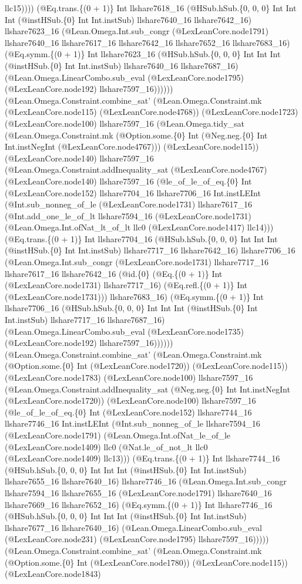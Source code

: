 \documentclass[11pt]{article}
\begin{document}
llc15)))) (@Eq.trans.\{(0 + 1)\} Int llshare7618\_16 (@HSub.hSub.\{0, 0, 0\} Int Int Int (@instHSub.\{0\} Int Int.instSub) llshare7640\_16 llshare7642\_16) llshare7623\_16 (@Lean.Omega.Int.sub\_congr (@LexLeanCore.node1791) llshare7640\_16 llshare7617\_16 llshare7642\_16 llshare7652\_16 llshare7683\_16) (@Eq.symm.\{(0 + 1)\} Int llshare7623\_16 (@HSub.hSub.\{0, 0, 0\} Int Int Int (@instHSub.\{0\} Int Int.instSub) llshare7640\_16 llshare7687\_16) (@Lean.Omega.LinearCombo.sub\_eval (@LexLeanCore.node1795) (@LexLeanCore.node192) llshare7597\_16)))))) (@Lean.Omega.Constraint.combine\_sat' (@Lean.Omega.Constraint.mk (@LexLeanCore.node115) (@LexLeanCore.node4768)) (@LexLeanCore.node1723) (@LexLeanCore.node100) llshare7597\_16 (@Lean.Omega.tidy\_sat (@Lean.Omega.Constraint.mk (@Option.some.\{0\} Int (@Neg.neg.\{0\} Int Int.instNegInt (@LexLeanCore.node4767))) (@LexLeanCore.node115)) (@LexLeanCore.node140) llshare7597\_16 (@Lean.Omega.Constraint.addInequality\_sat (@LexLeanCore.node4767) (@LexLeanCore.node140) llshare7597\_16 (@le\_of\_le\_of\_eq.\{0\} Int (@LexLeanCore.node152) llshare7704\_16 llshare7706\_16 Int.instLEInt (@Int.sub\_nonneg\_of\_le (@LexLeanCore.node1731) llshare7617\_16 (@Int.add\_one\_le\_of\_lt llshare7594\_16 (@LexLeanCore.node1731) (@Lean.Omega.Int.ofNat\_lt\_of\_lt llc0 (@LexLeanCore.node1417) llc14))) (@Eq.trans.\{(0 + 1)\} Int llshare7704\_16 (@HSub.hSub.\{0, 0, 0\} Int Int Int (@instHSub.\{0\} Int Int.instSub) llshare7717\_16 llshare7642\_16) llshare7706\_16 (@Lean.Omega.Int.sub\_congr (@LexLeanCore.node1731) llshare7717\_16 llshare7617\_16 llshare7642\_16 (@id.\{0\} (@Eq.\{(0 + 1)\} Int (@LexLeanCore.node1731) llshare7717\_16) (@Eq.refl.\{(0 + 1)\} Int (@LexLeanCore.node1731))) llshare7683\_16) (@Eq.symm.\{(0 + 1)\} Int llshare7706\_16 (@HSub.hSub.\{0, 0, 0\} Int Int Int (@instHSub.\{0\} Int Int.instSub) llshare7717\_16 llshare7687\_16) (@Lean.Omega.LinearCombo.sub\_eval (@LexLeanCore.node1735) (@LexLeanCore.node192) llshare7597\_16)))))) (@Lean.Omega.Constraint.combine\_sat' (@Lean.Omega.Constraint.mk (@Option.some.\{0\} Int (@LexLeanCore.node1720)) (@LexLeanCore.node115)) (@LexLeanCore.node1783) (@LexLeanCore.node100) llshare7597\_16 (@Lean.Omega.Constraint.addInequality\_sat (@Neg.neg.\{0\} Int Int.instNegInt (@LexLeanCore.node1720)) (@LexLeanCore.node100) llshare7597\_16 (@le\_of\_le\_of\_eq.\{0\} Int (@LexLeanCore.node152) llshare7744\_16 llshare7746\_16 Int.instLEInt (@Int.sub\_nonneg\_of\_le llshare7594\_16 (@LexLeanCore.node1791) (@Lean.Omega.Int.ofNat\_le\_of\_le (@LexLeanCore.node1409) llc0 (@Nat.le\_of\_not\_lt llc0 (@LexLeanCore.node1409) llc13))) (@Eq.trans.\{(0 + 1)\} Int llshare7744\_16 (@HSub.hSub.\{0, 0, 0\} Int Int Int (@instHSub.\{0\} Int Int.instSub) llshare7655\_16 llshare7640\_16) llshare7746\_16 (@Lean.Omega.Int.sub\_congr llshare7594\_16 llshare7655\_16 (@LexLeanCore.node1791) llshare7640\_16 llshare7669\_16 llshare7652\_16) (@Eq.symm.\{(0 + 1)\} Int llshare7746\_16 (@HSub.hSub.\{0, 0, 0\} Int Int Int (@instHSub.\{0\} Int Int.instSub) llshare7677\_16 llshare7640\_16) (@Lean.Omega.LinearCombo.sub\_eval (@LexLeanCore.node231) (@LexLeanCore.node1795) llshare7597\_16))))) (@Lean.Omega.Constraint.combine\_sat' (@Lean.Omega.Constraint.mk (@Option.some.\{0\} Int (@LexLeanCore.node1780)) (@LexLeanCore.node115)) (@LexLeanCore.node1843) 
\end{document}
